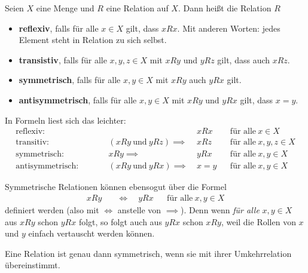 \begin{defin}    
    Seien $X$ eine Menge und $R$ eine Relation auf $X$. Dann heißt die Relation $R$
    \begin{itemize}
        \item \textbf{reflexiv}, falls für alle $x\in X$ gilt, dass $xRx$. Mit anderen Worten: jedes Element steht in Relation zu sich selbst.
        \item \textbf{transistiv}, falls für alle $x,y,z\in X$ mit $xRy$ und $yRz$ gilt, dass auch $xRz$.
        \item \textbf{symmetrisch}, falls für alle $x,y\in X$ mit $xRy$ auch $yRx$ gilt.
        \item \textbf{antisymmetrisch}, falls für alle $x,y\in X$ mit $xRy$ und $yRx$ gilt, dass $x=y$.
    \end{itemize}
    In Formeln liest sich das leichter:
    \begin{align*}
        \text{reflexiv:} \qquad &&& xRx && \text{für alle}\ x\in X \\
        \text{transitiv:} \qquad && (xRy\ \text{und}\ yRz) \implies\ & xRz && \text{für alle}\ x,y,z\in X\\
        \text{symmetrisch:} \qquad && xRy \implies\ & yRx && \text{für alle}\ x,y\in X \\
        \text{antisymmetrisch:} \qquad && (xRy\ \text{und}\ yRx) \implies\ & x=y && \text{für alle}\ x,y\in X
    \end{align*}
\end{defin}


\begin{bem}
    Symmetrische Relationen können ebensogut über die Formel
    \begin{align*}
        xRy\quad & \iff \quad yRx && \text{für alle}\ x,y\in X
    \end{align*}
    definiert werden (also mit $\iff$ anstelle von $\implies$). Denn wenn \emph{für alle} $x,y\in X$ aus $xRy$ schon $yRx$ folgt, so folgt auch aus $yRx$ schon $xRy$, weil die Rollen von $x$ und $y$ einfach vertauscht werden können.

    Eine Relation ist genau dann symmetrisch, wenn sie mit ihrer Umkehrrelation übereinstimmt.
\end{bem}


